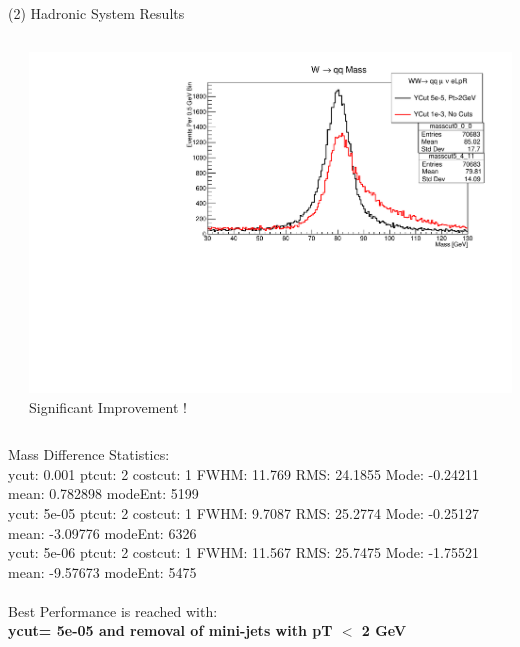 \documentclass[10pt]{beamer}
\begin{document}
\begin{frame}{(2) Hadronic System Results}
\begin{columns}
\begin{column}{0.5\textwidth}
   
\end{column}
\begin{column}{0.5\textwidth}
	\includegraphics[scale=0.3, left]{SupMass.pdf}\\
	\scriptsize
	\quad \quad \quad \quad Significant Improvement !
\end{column}	
\end{columns}
\tiny
 Mass Difference Statistics:\\
 ycut: 0.001  ptcut: 2  costcut: 1  FWHM: 11.769 RMS: 24.1855 Mode: -0.24211 mean: 0.782898 modeEnt: 5199\\
 ycut: 5e-05  ptcut: 2  costcut: 1  FWHM: 9.7087 RMS: 25.2774 Mode: -0.25127 mean: -3.09776 modeEnt: 6326\\
 ycut: 5e-06  ptcut: 2  costcut: 1  FWHM: 11.567 RMS: 25.7475 Mode: -1.75521 mean: -9.57673 modeEnt: 5475\\

\quad \quad \\
\normalsize
Best Performance is reached with:\\
\textbf{ycut= 5e-05 and removal of mini-jets with pT $<$ 2 GeV }


\end{frame}
\end{document}

